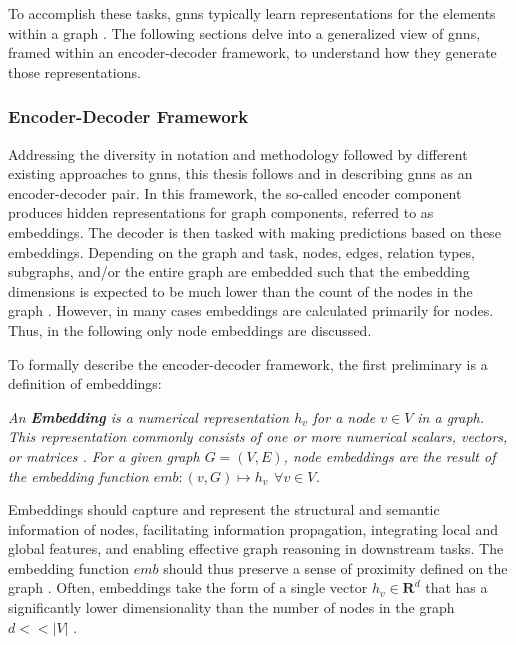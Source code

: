 To accomplish these tasks, \glspl{gnn} typically learn representations for the elements within a graph \cite{zhou_graph_2020}. The following sections delve into a generalized view of \glspl{gnn}, framed within an encoder-decoder framework, to understand how they generate those representations.

\subsubsection{Encoder-Decoder Framework}
\label{s_Background_GNNs_EncoderDecoderFramework}

Addressing the diversity in notation and methodology followed by different existing approaches to \glspl{gnn}, this thesis follows \cite{hamilton_representation_2017} and \cite{kazemi_representation_2019} in describing \glspl{gnn} as an encoder-decoder pair. In this framework, the so-called encoder component produces hidden representations for graph components, referred to as embeddings. The decoder is then tasked with making predictions based on these embeddings. Depending on the graph and task, nodes, edges, relation types, subgraphs, and/or the entire graph are embedded such that the embedding dimensions is expected to be much lower than the count of the nodes in the graph \cite{barros_survey_2023}. However, in many cases embeddings are calculated primarily for nodes. Thus, in the following only node embeddings are discussed.

To formally describe the encoder-decoder framework, the first preliminary is a definition of embeddings:

\begin{definition}
    \label{d_Embedding}
    \textit{An \textbf{Embedding} is a numerical representation $h_v$ for a node $v \in V$ in a graph. This representation commonly consists of one or more numerical scalars, vectors, or matrices \cite{kazemi_representation_2019}. For a given graph $G = (V, E)$, node embeddings are the result of the embedding function $emb: (v, G) \mapsto h_v \hspace{5pt} \forall v \in V$.}
\end{definition}

Embeddings should capture and represent the structural and semantic information of nodes, facilitating information propagation, integrating local and global features, and enabling effective graph reasoning in downstream tasks. The embedding function $emb$ should thus preserve a sense of proximity defined on the graph \cite{goyal_graph_2018}. Often, embeddings take the form of a single vector $h_v \in \mathbf{R}^d$ that has a significantly lower dimensionality than the number of nodes in the graph $d<<|V|$ \cite{goyal_graph_2018}.


